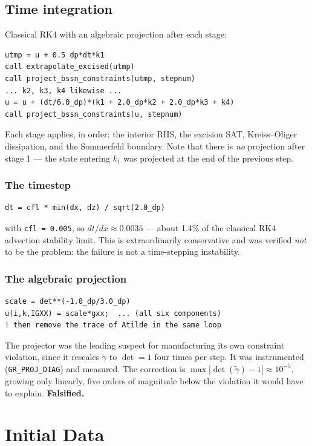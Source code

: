 \documentclass[11pt,openany]{book}
\newcommand{\etr}{\tilde{\gamma}}
\begin{document}
\section{Time integration}

Classical RK4 with an algebraic projection after each stage:
\begin{lstlisting}
utmp = u + 0.5_dp*dt*k1
call extrapolate_excised(utmp)
call project_bssn_constraints(utmp, stepnum)
... k2, k3, k4 likewise ...
u = u + (dt/6.0_dp)*(k1 + 2.0_dp*k2 + 2.0_dp*k3 + k4)
call project_bssn_constraints(u, stepnum)
\end{lstlisting}
Each stage applies, in order: the interior RHS, the excision SAT, Kreiss--Oliger
dissipation, and the Sommerfeld boundary. Note that there is \emph{no}
projection after stage 1 --- the state entering $k_1$ was projected at the end
of the previous step.

\subsection{The timestep}

\begin{lstlisting}
dt = cfl * min(dx, dz) / sqrt(2.0_dp)
\end{lstlisting}
with \texttt{cfl = 0.005}, so $dt/dx \approx 0.0035$ --- about 1.4\% of the
classical RK4 advection stability limit. This is extraordinarily conservative
and was verified \emph{not} to be the problem: the failure is not a
time-stepping instability.

\subsection{The algebraic projection}

\begin{lstlisting}
scale = det**(-1.0_dp/3.0_dp)
u(i,k,IGXX) = scale*gxx;  ... (all six components)
! then remove the trace of Atilde in the same loop
\end{lstlisting}

\gotcha
The projector was the leading suspect for manufacturing its own constraint
violation, since it rescales $\etr$ to $\det = 1$ four times per step. It was
instrumented (\texttt{GR\_PROJ\_DIAG}) and measured. The correction is
$\max|\det(\etr) - 1| \approx 10^{-5}$, growing only linearly, five orders of
magnitude below the violation it would have to explain. \textbf{Falsified.}

\chapter{Initial Data}
\label{ch:id}
\end{document}
